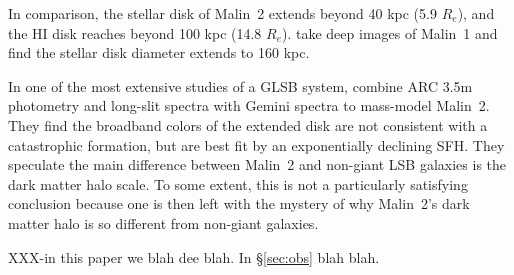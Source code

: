 \documentclass{emulateapj}
\newcommand\msun{\rm{M}_\odot}
\newcommand\HI{\ion{H}{1}}
\begin{document}
In comparison, the stellar disk of Malin~2 extends beyond 40 kpc (5.9 $R_e$), and the HI disk reaches beyond 100 kpc (14.8 $R_e$).  \citet{Galaz15} take deep images of Malin~1 and find the stellar disk diameter extends to 160 kpc.  








In one of the most extensive studies of a GLSB system, \citet{Kasparova14} combine ARC 3.5m photometry and long-slit spectra with Gemini spectra to mass-model Malin~2.  They find the broadband colors of the extended disk are not consistent with a catastrophic formation, but are best fit by an exponentially declining SFH.  They speculate the main difference between Malin~2 and non-giant LSB galaxies is the dark matter halo scale.  To some extent, this is not a particularly satisfying conclusion because one is then left with the mystery of why Malin~2's dark matter halo is so different from non-giant galaxies.


XXX-in this paper we blah dee blah. In \S\ref{sec:obs} blah blah.


\end{document}
